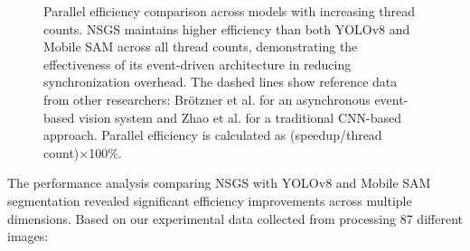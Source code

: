 \documentclass[conference]{IEEEtran}
\begin{document}
\begin{figure}[t]
    \centering
    \caption{Parallel efficiency comparison across models with increasing thread counts. NSGS maintains higher efficiency than both YOLOv8 and Mobile SAM across all thread counts, demonstrating the effectiveness of its event-driven architecture in reducing synchronization overhead. The dashed lines show reference data from other researchers: Brötzner et al. \cite{Brotzner2022} for an asynchronous event-based vision system and Zhao et al. \cite{Zhao2019} for a traditional CNN-based approach. Parallel efficiency is calculated as (speedup/thread count)×100\%.}
    \label{fig:parallel_efficiency}
\end{figure}

The performance analysis comparing NSGS with YOLOv8 and Mobile SAM segmentation revealed significant efficiency improvements across multiple dimensions. Based on our experimental data collected from processing 87 different images:
\end{document}

